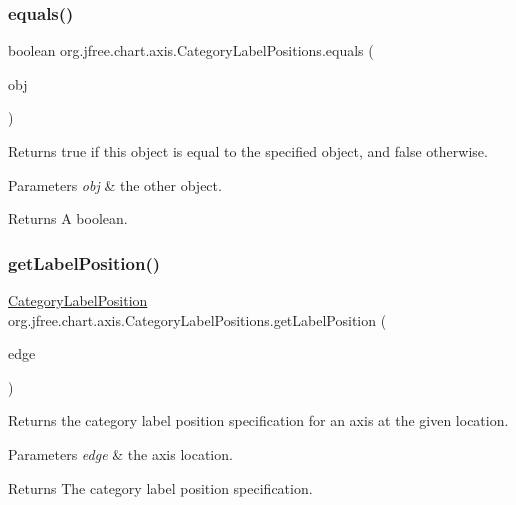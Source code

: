 \subsubsection{\texorpdfstring{equals()}{equals()}}
{\footnotesize\ttfamily boolean org.\+jfree.\+chart.\+axis.\+Category\+Label\+Positions.\+equals (\begin{DoxyParamCaption}\item[{Object}]{obj }\end{DoxyParamCaption})}

Returns {\ttfamily true} if this object is equal to the specified object, and {\ttfamily false} otherwise.


\begin{DoxyParams}{Parameters}
{\em obj} & the other object.\\
\hline
\end{DoxyParams}
\begin{DoxyReturn}{Returns}
A boolean. 
\end{DoxyReturn}
\mbox{\label{classorg_1_1jfree_1_1chart_1_1axis_1_1_category_label_positions_a6ffe0f8ad78bee09baee1743a8b43328}} 
\subsubsection{\texorpdfstring{get\+Label\+Position()}{getLabelPosition()}}
{\footnotesize\ttfamily \mbox{\hyperlink{classorg_1_1jfree_1_1chart_1_1axis_1_1_category_label_position}{Category\+Label\+Position}} org.\+jfree.\+chart.\+axis.\+Category\+Label\+Positions.\+get\+Label\+Position (\begin{DoxyParamCaption}\item[{Rectangle\+Edge}]{edge }\end{DoxyParamCaption})}

Returns the category label position specification for an axis at the given location.


\begin{DoxyParams}{Parameters}
{\em edge} & the axis location.\\
\hline
\end{DoxyParams}
\begin{DoxyReturn}{Returns}
The category label position specification. 
\end{DoxyReturn}
\mbox{\label{classorg_1_1jfree_1_1chart_1_1axis_1_1_category_label_positions_a6f4f0831724cdbc69d917f0e87d91759}} 
